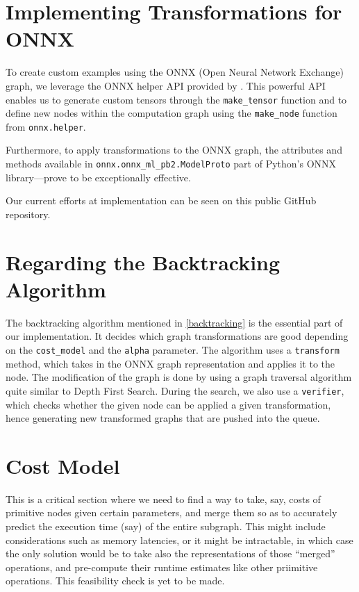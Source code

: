 \documentclass[12pt,a4paper,twoside,openright,bibliography=totocnumbered]{report}
\begin{document}
	\section{Implementing Transformations for ONNX}
	To create custom examples using the ONNX (Open Neural Network Exchange) graph, we leverage the ONNX helper API provided by \cite{onnxpython}. This powerful API enables us to generate custom tensors through the \verb|make_tensor| function and to define new nodes within the computation graph using the \verb|make_node| function from \verb|onnx.helper|. 

	Furthermore, to apply transformations to the ONNX graph, the attributes and methods available in \verb|onnx.onnx_ml_pb2.ModelProto| part of Python's ONNX library—prove to be exceptionally effective.

	Our current efforts at implementation can be seen on this public GitHub repository.

	\section{Regarding the Backtracking Algorithm}
	The backtracking algorithm mentioned in \ref{backtracking} is the essential part of our implementation. It decides which graph transformations are good depending on the \verb|cost_model| and the \verb|alpha| parameter. The algorithm uses a \verb|transform| method, which takes in the ONNX graph representation and applies it to the node. The modification of the graph is done by using a graph traversal algorithm quite similar to Depth First Search. During the search, we also use a \verb|verifier|, which checks whether the given node can be applied a given transformation, hence generating new transformed graphs that are pushed into the queue.

	\section{Cost Model}
	This is a critical section where we need to find a way to take, say, costs of primitive nodes given certain parameters, and merge them so as to accurately predict the execution time (say) of the entire subgraph. This might include considerations such as memory latencies, or it might be intractable, in which case the only solution would be to take also the representations of those ``merged'' operations, and pre-compute their runtime estimates like other priimitive operations. This feasibility check is yet to be made.
\end{document}

